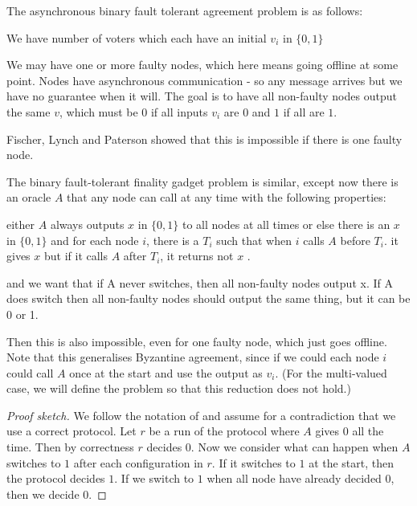 \documentclass{article}
\begin{document}
{The asynchronous binary fault tolerant agreement problem is as follows:

We have  number of voters which each have an initial $v_i$ in $\{0,1\}$

We may have one or more faulty nodes, which here means going offline at some point. Nodes have asynchronous communication - so any message arrives but we have no guarantee when it will.
The goal is to have all non-faulty nodes output the same $v$, which must be $0$ if all inputs $v_i$ are $0$ and $1$ if all are $1$.

Fischer, Lynch and Paterson\cite{flp} showed that this is impossible if there is one faulty node.

The binary fault-tolerant finality gadget problem is similar, except now there is an oracle $A$ that any node can call at any time with the following properties:

either $A$ always outputs $x$ in $\{0,1\}$ to all nodes at all times
or else there is an $x$ in $\{0,1\}$ and
for each node $i$, there is a $T_i$ such that when $i$ calls $A$ before $T_i$. it gives $x$ but if it calls $A$ after $T_i$, it returns not $x$ .

and we want that if A never switches, then all non-faulty nodes output x. If A does switch then all non-faulty nodes should output the same thing, but it can be 0 or 1. 

Then this is also impossible, even for one faulty node, which just goes offline. Note that this generalises Byzantine agreement, since if we could each node $i$ could call $A$ once at the start and use the output as $v_i$. (For the multi-valued case, we will define the problem so that this reduction does not hold.)


\begin{proof}[Proof sketch] We follow the notation of  \cite{flp} and assume for a contradiction that we use a correct protocol. 
Let $r$ be a run of the protocol where $A$ gives $0$ all the time. Then by correctness $r$ decides $0$. Now we consider what can happen when $A$ switches to $1$ after each configuration in $r$. If it switches to $1$ at the start, then the protocol decides $1$. If we switch to $1$ when all node have already decided $0$, then we decide $0$.


\end{proof}}
\end{document}
